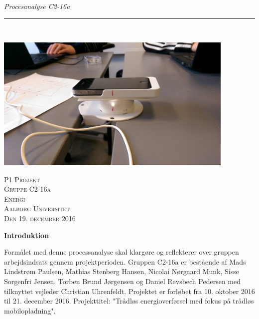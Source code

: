 
\raggedbottom

\thispagestyle{empty}
\begin{flushright}
\vspace{3cm}

\phantom{hul}

\phantom{hul}

\phantom{hul}

\textsl{\Huge Procesanalyse C2-16a} \\ \vspace{1cm}

\rule{13cm}{3mm} \\ \vspace{1.5cm}
\vspace{1cm}

\includegraphics[width=0.864\textwidth]{forsg2_opstilling}

\vspace{2cm} 
\textsc{\Large P1 Projekt \\
Gruppe C2-16a \\
Energi\\
Aalborg Universitet\\
Den 19. december 2016\\}
\end{flushright}

\newpage

\textbf{Introduktion}

Formålet med denne processanalyse skal klargøre og reflekterer over gruppen arbejdsindsats gennem projektperioden. Gruppen C2-16a er bestående af Mads Lindstrøm Paulsen, Mathias Stenberg Hansen, Nicolai Nørgaard Munk, Sisse Sorgenfri Jensen, Torben Brund Jørgensen og Daniel Revsbech Pedersen med tilknyttet vejleder Christian Uhrenfeldt. Projektet er forløbet fra 10. oktober 2016 til 21. december 2016. Projekttitel: "Trådløs energioverførsel med fokus på trådløs mobilopladning".

